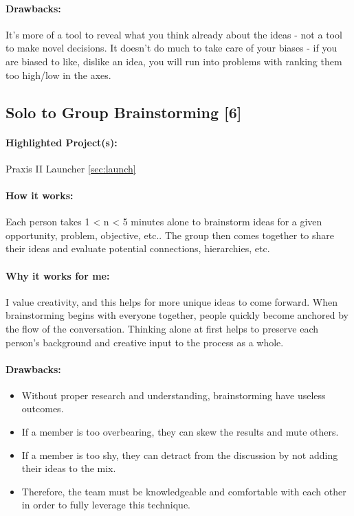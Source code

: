 \documentclass[a4paper,12pt]{article}
\begin{document}
\paragraph{Drawbacks: }
It’s more of a tool to reveal what you think already about the ideas - not a tool to make novel decisions. It doesn’t do much to take care of your biases - if you are biased to {like, dislike} an idea, you will run into problems with ranking them too high/low in the axes.

\subsection{Solo to Group Brainstorming [6]}
\label{sec:solo}
\paragraph{Highlighted Project(s): } Praxis II Launcher \ref{sec:launch}
\paragraph{How it works: } 
Each person takes 1 < n < 5 minutes alone to brainstorm ideas for a given {opportunity, problem, objective, etc.}. The group then comes together to share their ideas and evaluate potential {connections, hierarchies, etc.}

\paragraph{Why it works for me: }
I value creativity, and this helps for more unique ideas to come forward. When brainstorming begins with everyone together, people quickly become anchored by the flow of the conversation. Thinking alone at first helps to preserve each person’s background and creative input to the process as a whole.


\paragraph{Drawbacks: }
\begin{itemize}
	\item Without proper research and understanding, brainstorming have useless outcomes.
	\item If a member is too overbearing, they can skew the results and mute others.
	\item If a member is too shy, they can detract from the discussion by not adding their ideas to the mix.
	\item Therefore, the team must be knowledgeable and comfortable with each other in order to fully leverage this technique.
\end{itemize}
\end{document}

